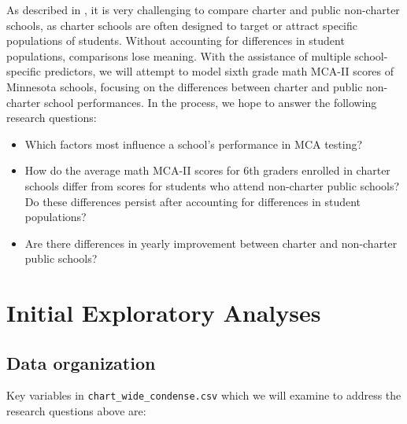\documentclass[
]{krantz}
\providecommand{\tightlist}{%
  \setlength{\itemsep}{0pt}\setlength{\parskip}{0pt}}
\begin{document}
As described in \citet{Green2003}, it is very challenging to compare charter and public non-charter schools, as charter schools are often designed to target or attract specific populations of students. Without accounting for differences in student populations, comparisons lose meaning. With the assistance of multiple school-specific predictors, we will attempt to model sixth grade math MCA-II scores of Minnesota schools, focusing on the differences between charter and public non-charter school performances. In the process, we hope to answer the following research questions:

\begin{itemize}
\tightlist
\item
  Which factors most influence a school's performance in MCA testing?
\item
  How do the average math MCA-II scores for 6th graders enrolled in charter schools differ from scores for students who attend non-charter public schools? Do these differences persist after accounting for differences in student populations?
\item
  Are there differences in yearly improvement between charter and non-charter public schools?
\end{itemize}

\hypertarget{exploratoryanalysis}{%
\section{Initial Exploratory Analyses}\label{exploratoryanalysis}}

\hypertarget{data}{%
\subsection{Data organization}\label{data}}

Key variables in \texttt{chart\_wide\_condense.csv} which we will examine to address the research questions above are:
\end{document}
